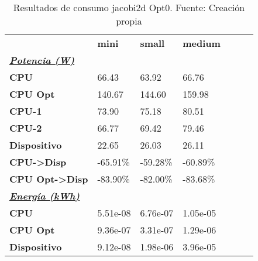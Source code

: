 \begin{table}[H]
    \centering
    \begin{tabular}{lllllll}
    \rowcolor[HTML]{DAE8FC} \ & \textbf{mini} & \textbf{	small} & \textbf{	medium} \\
    \cellcolor[HTML]{DAE8FC} \textbf{\textbf{{\emph{{\underline{{Potencia (W)}}}}}}} &  & 	 & 	 \\
    \rowcolor[HTML]{EFEFEF} \cellcolor[HTML]{DAE8FC} \textbf{CPU} & 66.43 & 	63.92 & 	66.76 \\
    \cellcolor[HTML]{DAE8FC} \textbf{CPU Opt} & 140.67 & 	144.60 & 	159.98 \\
    \rowcolor[HTML]{EFEFEF} \cellcolor[HTML]{DAE8FC} \textbf{\quad CPU-1} & 73.90 & 	75.18 & 	80.51 \\
    \cellcolor[HTML]{DAE8FC} \textbf{\quad CPU-2} & 66.77 & 	69.42 & 	79.46 \\
    \rowcolor[HTML]{EFEFEF} \cellcolor[HTML]{DAE8FC} \textbf{Dispositivo} & 22.65 & 	26.03 & 	26.11 \\
    \cellcolor[HTML]{DAE8FC} \textbf{CPU->Disp} & -65.91\% & 	-59.28\% & 	-60.89\% \\
    \rowcolor[HTML]{EFEFEF} \cellcolor[HTML]{DAE8FC} \textbf{CPU Opt->Disp} & -83.90\% & 	-82.00\% & 	-83.68\% \\
    \cellcolor[HTML]{DAE8FC} \textbf{\textbf{{\emph{{\underline{{Energía (kWh)}}}}}}} &  & 	 & 	 \\
    \rowcolor[HTML]{EFEFEF} \cellcolor[HTML]{DAE8FC} \textbf{CPU} & 5.51e-08 & 	6.76e-07 & 	1.05e-05 \\
    \cellcolor[HTML]{DAE8FC} \textbf{CPU Opt} & 9.36e-07 & 	3.31e-07 & 	1.29e-06 \\
    \rowcolor[HTML]{EFEFEF} \cellcolor[HTML]{DAE8FC} \textbf{Dispositivo} & 9.12e-08 & 	1.98e-06 & 	3.96e-05 \\
    \end{tabular}
    \caption[Resultados de consumo jacobi2d Opt0]{{Resultados de consumo jacobi2d Opt0. Fuente: Creación propia}}
    \label{table_test_jacobi2d_Opt0_hw_powerResults}
\end{table}